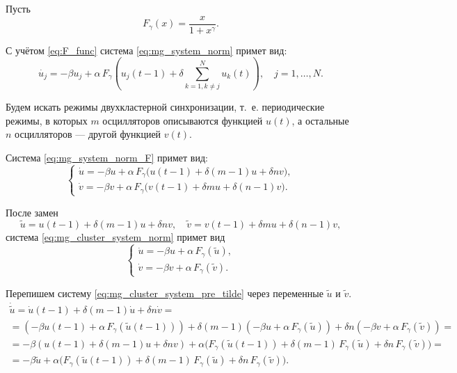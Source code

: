 Пусть
%
\begin{equation}
	\label{eq:F_func}
	F_{\gamma}(x) = \dfrac{x}{1 + x^\gamma}.
\end{equation}

С учётом \eqref{eq:F_func} система \eqref{eq:mg_system_norm} примет вид:
%
\begin{equation}
	\label{eq:mg_system_norm_F}
	\dot{u_j} = -\beta u_j + \alpha\,F_{\gamma}\left(u_j(t - 1) + \delta \sum_{k = 1, k\neq j}^{N}u_{k}(t)\right), \quad j = 1, \ldots, N.
\end{equation}

Будем искать режимы двухкластерной синхронизации, т.~е. периодические режимы, в которых $m$ осцилляторов описываются функцией $u(t)$, а остальные $n$ осцилляторов --- другой функцией $v(t)$.

Система \eqref{eq:mg_system_norm_F} примет вид:
%
\begin{equation}
	\label{eq:mg_cluster_system_norm}
	\begin{cases}
		\dot{u} = -\beta u + \alpha \, F_{\gamma} \big(u(t - 1) + \delta (m - 1) u + \delta n v\big),\\
		\dot{v} = -\beta v + \alpha  \, F_{\gamma} \big(v(t - 1) + \delta m u + \delta (n - 1) v\big).
	\end{cases}
\end{equation}

После замен
\begin{equation}
	\label{eq:tilde_change}
	\tilde{u} = u(t - 1) + \delta (m - 1) u + \delta n v, \quad \tilde{v} = v(t - 1) + \delta m u + \delta (n - 1) v,
\end{equation}
%
система \eqref{eq:mg_cluster_system_norm} примет вид
%
\begin{equation}
	\label{eq:mg_cluster_system_pre_tilde}
	\begin{cases}
		\dot{u} = -\beta u + \alpha \, F_{\gamma}(\tilde{u}),\\
		\dot{v} = -\beta v + \alpha \, F_{\gamma}(\tilde{v}).
	\end{cases}
\end{equation}


Перепишем систему \eqref{eq:mg_cluster_system_pre_tilde} через переменные $\tilde{u}$ и $\tilde{v}$.
\begin{multline*}
	\dot{\tilde{u}} = \dot{u}(t - 1) + \delta (m - 1) \dot{u} + \delta n \dot{v} =\\= \left(-\beta u(t - 1) + \alpha \, F_{\gamma}(\tilde{u}(t - 1))\right) + \delta (m - 1)(-\beta u + \alpha\, F_{\gamma}(\tilde{u})) + \delta n (-\beta v + \alpha \, F_{\gamma}(\tilde{v})) =\\
	= -\beta(u(t - 1) + \delta (m - 1)u + \delta nv) + \alpha\big(F_{\gamma}(\tilde{u}(t - 1)) + \delta (m - 1) \, F_{\gamma}(\tilde{u}) + \delta n \, F_{\gamma}(\tilde{v})\big) = \\
	= -\beta \tilde{u} + \alpha \big(F_{\gamma}(\tilde{u}(t - 1)) + \delta (m - 1)\, F_{\gamma}(\tilde{u}) + \delta n \, F_{\gamma}(\tilde{v})\big).
\end{multline*}

